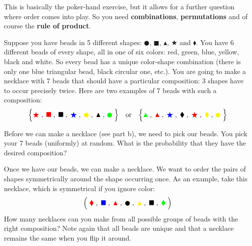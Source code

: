 \documentclass[a4paper,10pt,landscape,twocolumn]{scrartcl}
\begin{document}
\begin{exercise}[Necklaces (4pt)]
	\begin{mycomment}
		This is basically the poker-hand exercise, but it allows for a further question where order comes into play. So you need \textbf{combinations}, \textbf{permutations} and of course the \textbf{rule of product}. 
	\end{mycomment}
	
	Suppose you have beads in 5 different shapes: $\CIRCLE$, $\blacksquare$, $\blacktriangle$, $\bigstar$ and $\blacklozenge$. You have 6 different beads of every shape, all in one of six colors: red, green, blue, yellow, black and white. So every bead has a unique color-shape combination (there is only one blue triangular bead, black circular one, etc.). You are going to make a necklace with 7 beads that should have a particular composition: 3 shapes have to occur precisely twice. Here are two examples of 7 beads with such a composition:
		\[
			\Bigr \{ {\color{red}\bigstar}
					\;, \; {\color{red} \blacksquare}
					\;, \; \blacksquare
					\;, \; {\color{blue}\bigstar}
					\;, \; {\color{yellow} \CIRCLE}
					\;, \; \blacktriangle
					\;, \, {\color{green}\CIRCLE}
			 \; \Bigl\}
			\quad \mathrm{or} \quad
			\Bigr \{ {\color{green}\blacktriangle} 
					\;, \; {\color{red} \blacktriangle}
					\;, \; {\color{blue}\bigstar}
					\;,\; \blacklozenge
					\;, \; {\color{red}\bigstar}
					\;, \; {\color{yellow} \blacklozenge}
					\;, \, {\color{yellow}\CIRCLE} 
			\; \Bigl\}
		\]

	\begin{subex}[3pt]
		Before we can make a necklace (see part b), we need to pick our beads. You pick your 7 beads (uniformly) at random. What is the probability that they have the desired composition?
	\end{subex}
	
	\begin{subex}[1pt]
		Once we have our beads, we can make a necklace. We want to order the pairs of shapes symmetrically around the shape occurring once. As an example, take this necklace, which is symmetrical if you ignore color:
		\[	
		\Bigl (\; {\color{red}\blacklozenge}
			\;,\; {\color{blue}\blacksquare}
			\;,\; {\color{red}\blacktriangle}
			\;,\; {\color{black}\CIRCLE}
			\;,\; {\color{yellow}\blacktriangle}
			\;,\; {\color{black}\blacksquare}
			\;,\; {\color{green}\blacklozenge}
		\; \Bigr)
		\]
		How many necklaces can you make from all possible groups of beads with the right composition? Note again that all beads are unique and that a necklace remains the same when you flip it around.
	\end{subex}
\end{exercise}
\end{document}
